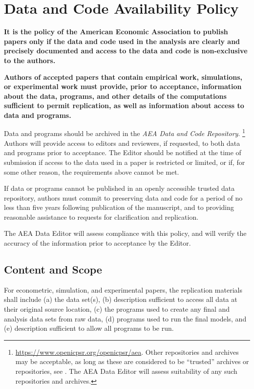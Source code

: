 \section{Data and Code Availability Policy}\label{data-and-code-availability-policy}

\textbf{It is the policy of the American Economic Association to publish
papers only if the data and code used in the analysis are clearly and
precisely documented and access to the data and code is non-exclusive to
the authors.}

\textbf{Authors of accepted papers that contain empirical work,
simulations, or experimental work must provide, prior to acceptance,
information about the data, programs, and other details of the
computations sufficient to permit replication, as well as information
about access to data and programs.}

Data and programs should be archived in the
\emph{AEA Data and Code
Repository}.%
\footnote{\url{https://www.openicpsr.org/openicpsr/aea}. Other repositories and archives may be
	acceptable, as long as these are considered to be ``trusted'' archives or
	repositories, see
	.
	The AEA Data Editor will assess suitability of any such repositories and
	archives.} 
Authors will provide access to
editors and reviewers, if requested, to both data and programs prior to
acceptance. The Editor should be notified at the time of submission if
access to the data used in a paper is restricted or limited, or if, for
some other reason, the requirements above cannot be met.

If data or programs cannot be published in an openly accessible trusted
data repository, authors must commit to preserving data and code for a
period of no less than five years following publication of the
manuscript, and to providing reasonable assistance to requests for
clarification and replication.

The AEA Data Editor will assess compliance with this policy, and will
verify the accuracy of the information prior to acceptance by the
Editor.

\subsection{Content and Scope}\label{content-and-scope}

For econometric, simulation, and experimental papers, the replication
materials shall include (a) the data set(s), (b) description sufficient
to access all data at their original source location, (c) the programs
used to create any final and analysis data sets from raw data, (d)
programs used to run the final models, and (e) description sufficient to
allow all programs to be run.


